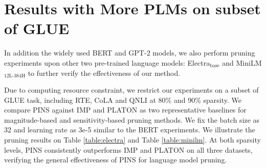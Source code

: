 \documentclass[11pt]{article}
\newcommand{\tabref}[1]{Table \ref{#1}}
\begin{document}
	\appendix
	\section{Results with More PLMs on subset of GLUE}
	In addition the widely used BERT and GPT-2 models, we also perform pruning experiments upon other two pre-trained language models: Electra$_{\text{base}}$ and MiniLM$_{\text{12L-384H}}$ to further verify the effectiveness of our method. 
	
	Due to computing resource constraint, we restrict our experiments on a subset of GLUE task, including RTE, CoLA and QNLI at 80\% and 90\% sparsity. We compare PINS against IMP and PLATON as two representative baselines for magnitude-based and sensitivity-based pruning methods. We fix the batch size as 32 and learning rate as 3e-5 similar to the BERT experiments. We illustrate the pruning results on \tabref{table:electra} and \tabref{table:minilm}. At both sparsity levels, PINS consistently outperforms IMP and PLATON on all three datasets, verifying the general effectiveness of PINS for language model pruning.
\end{document}
